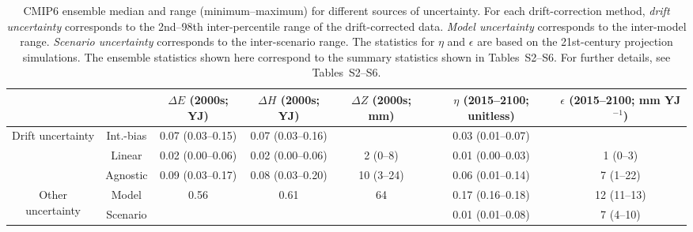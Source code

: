 \begin{table*}[t]
\centering
\caption{CMIP6 ensemble median and range (minimum–maximum) for different sources of uncertainty. For each drift-correction method, \emph{drift uncertainty} corresponds to the 2nd--98th inter-percentile range of the drift-corrected data. \emph{Model uncertainty} corresponds to the inter-model range. \emph{Scenario uncertainty} corresponds to the inter-scenario range. The statistics for $\eta$ and $\epsilon$ are based on the 21st-century projection simulations. The ensemble statistics shown here correspond to the summary statistics shown in Tables~S2--S6. For further details, see Tables~S2--S6.}
\begin{tabular}{cc|c|c|c|c|c}
\toprule
 &  & $\Delta E$ (2000s; YJ) & $\Delta H$ (2000s; YJ) & $\Delta Z$ (2000s; mm) & $\eta$ (2015–2100; unitless) & $\epsilon$ (2015–2100; mm YJ$^{-1}$) \\
\midrule
\multirow[c]{3}{*}{Drift uncertainty} & Int.-bias & 0.07 (0.03–0.15) & 0.07 (0.03–0.16) &  & 0.03 (0.01–0.07) &  \\
 & Linear & 0.02 (0.00–0.06) & 0.02 (0.00–0.06) & 2 (0–8) & 0.01 (0.00–0.03) & 1 (0–3) \\
 & Agnostic & 0.09 (0.03–0.17) & 0.08 (0.03–0.20) & 10 (3–24) & 0.06 (0.01–0.14) & 7 (1–22) \\
\midrule
\multirow[c]{2}{*}{Other uncertainty} & Model & 0.56 & 0.61 & 64 & 0.17 (0.16–0.18) & 12 (11–13) \\
 & Scenario &  &  &  & 0.01 (0.01–0.08) & 7 (4–10) \\
\bottomrule
\end{tabular}
\end{table*}

